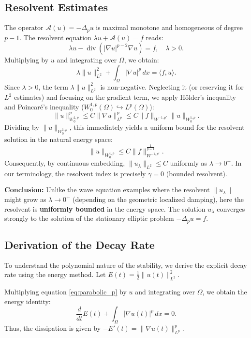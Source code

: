 \documentclass[11pt,reqno]{amsart}
\theoremstyle{remark}
\begin{document}
\subsection{Resolvent Estimates}
The operator $\mathcal{A}(u) = -\Delta_p u$ is maximal monotone and homogeneous of degree $p-1$. The resolvent equation $\lambda u + \mathcal{A}(u) = f$ reads:
\begin{equation}
    \lambda u - \operatorname{div}(|\nabla u|^{p-2}\nabla u) = f, \quad \lambda > 0.
\end{equation}
Multiplying by $u$ and integrating over $\Omega$, we obtain:
\[
    \lambda \|u\|_{L^2}^2 + \int_\Omega |\nabla u|^p \, dx = \langle f, u \rangle.
\]
Since $\lambda > 0$, the term $\lambda \|u\|_{L^2}^2$ is non-negative. Neglecting it (or reserving it for $L^2$ estimates) and focusing on the gradient term, we apply Hölder's inequality and Poincaré's inequality ($W_0^{1,p}(\Omega) \hookrightarrow L^p(\Omega)$):
\[
    \|u\|_{W_0^{1,p}}^p \le C \|\nabla u\|_{L^p}^p \le C \|f\|_{W^{-1,p'}} \|u\|_{W_0^{1,p}}.
\]
Dividing by $\|u\|_{W_0^{1,p}}$, this immediately yields a uniform bound for the resolvent solution in the natural energy space:
\[
    \|u\|_{W_0^{1,p}} \le C \|f\|_{W^{-1,p'}}^{\frac{1}{p-1}}.
\]
Consequently, by continuous embedding, $\|u_\lambda\|_{L^2} \le C$ uniformly as $\lambda \to 0^+$. In our terminology, the resolvent index is precisely $\gamma = 0$ (bounded resolvent).

\textbf{Conclusion:} Unlike the wave equation examples where the resolvent $\|u_\lambda\|$ might grow as $\lambda \to 0^+$ (depending on the geometric localized damping), here the resolvent is \textbf{uniformly bounded} in the energy space. The solution $u_\lambda$ converges strongly to the solution of the stationary elliptic problem $-\Delta_p u = f$.

\subsection{Derivation of the Decay Rate}
To understand the polynomial nature of the stability, we derive the explicit decay rate using the energy method. Let $E(t) = \frac{1}{2} \|u(t)\|_{L^2}^2$.

Multiplying equation \eqref{eq:parabolic_p} by $u$ and integrating over $\Omega$, we obtain the energy identity:
\begin{equation} \label{eq:energy_id}
    \frac{d}{dt} E(t) + \int_\Omega |\nabla u(t)|^p \, dx = 0.
\end{equation}
Thus, the dissipation is given by $-E'(t) = \|\nabla u(t)\|_{L^p}^p$.
\end{document}
